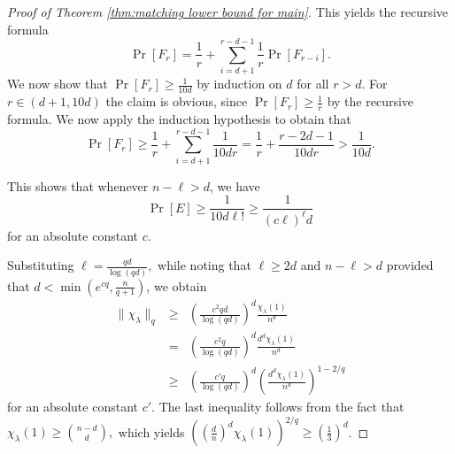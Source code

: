 \documentclass[11pt, letterpaper]{amsart}
\renewcommand\ge{\geqslant}
\begin{document}
\begin{proof}[Proof of Theorem \ref{thm:matching lower bound for main}]
{This yields the recursive formula \[ \Pr[F_r] = \frac{1}{r} + \sum_{i=d+1}^{r-d-1}\frac{1}{r}\Pr[F_{r-i}].\]
We now show that $\Pr[F_r]\ge \frac{1}{10d}$ by induction on $d$ for all $r> d$. For $r \in (d+1,10 d)$ the claim is obvious, since $\Pr[F_r] \ge \frac{1}{r}$ by the recursive formula. We now apply the induction hypothesis to obtain that %
\[
    \Pr[F_r]\ge \frac{1}{r} + \sum_{i=d+1}^{r-d-1} \frac{1}{10dr} = \frac{1}{r}+\frac{r-2d-1}{10dr}>\frac{1}{10 d}.
\]

This shows that whenever $n-\ell >d$, we have 
\[\Pr[E]\ge \frac{1}{10d \ell!} \ge \frac{1}{ (c\ell)^\ell d}\]
for an absolute constant $c$.}
Substituting $\ell=\frac{qd}{\log (qd)},$ while noting that $\ell\ge 2d$ and $n - \ell > d$ provided that $d < \min(e^{cq},\frac{n}{q+1})$, we obtain  
\begin{eqnarray*}
\|\chi_{\lambda}\|_q 
&\ge& \left(\frac{c^2qd}{\log (qd)}\right)^d\frac{\chi_\lambda(1)}{n^{d}} \\
&=& \left(\frac{c^2q}{\log(qd)}\right)^d\frac{d^d\chi_{\lambda}(1)}{n^d} \\
&\ge& \left(\frac{c'q}{\log(qd)}\right)^d \left(\frac{d^d\chi_{\lambda}(1)}{n^d}\right)^{1-2/q}
\end{eqnarray*}
for an absolute constant $c'$. The last inequality follows from the fact that $\chi_\lambda(1) \ge \binom{n-d}{d},$ which yields
$\left(\left(\frac{d}{n}\right)^d\chi_{\lambda}(1)\right)^{2/q} \ge \left(\frac{1}{3}\right)^{d}$.
\end{proof}
\end{document}
